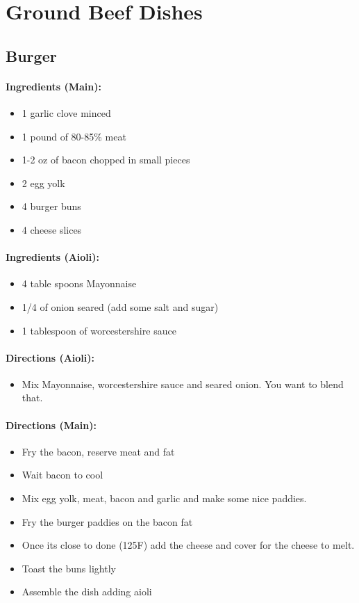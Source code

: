 \documentclass{article}
\begin{document}
\section{Ground Beef Dishes}


\subsection{Burger} 

\paragraph{Ingredients (Main):}
\begin{itemize}
    \item 1 garlic clove minced
    \item 1 pound of 80-85\% meat
    \item 1-2 oz of bacon chopped in small pieces
    \item 2 egg yolk
    \item 4 burger buns
    \item 4 cheese slices
\end{itemize}  

\paragraph{Ingredients (Aioli):}
\begin{itemize}
    \item 4 table spoons Mayonnaise
    \item 1/4 of onion seared (add some salt and sugar)
    \item 1 tablespoon of worcestershire sauce
\end{itemize}  

\paragraph{Directions (Aioli):}
\begin{itemize}
    \item Mix Mayonnaise, worcestershire sauce and seared onion. You want to blend that.
\end{itemize}  

\paragraph{Directions (Main):}
\begin{itemize}
    \item Fry the bacon, reserve meat and fat
    \item Wait bacon to cool
    \item Mix egg yolk, meat, bacon and garlic and make some nice paddies.
    \item Fry the burger paddies on the bacon fat
    \item Once its close to done (125F) add the cheese and cover for the cheese to melt.
    \item Toast the buns lightly
    \item Assemble the dish adding aioli
\end{itemize} 
\end{document}
